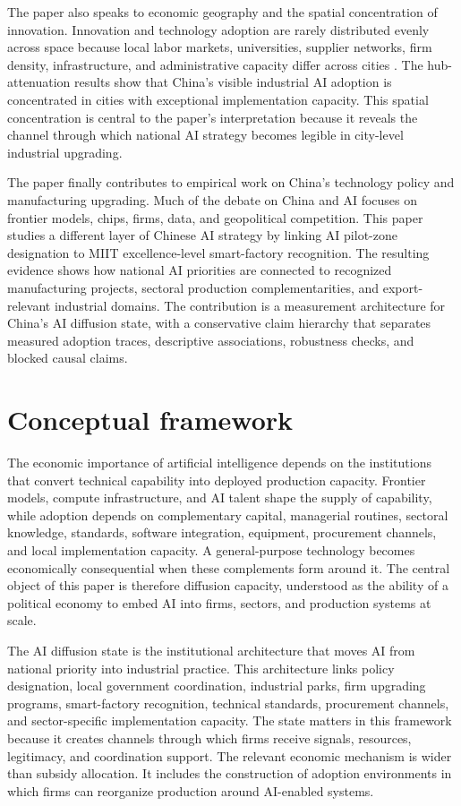 \documentclass[12pt]{article}
\begin{document}
The paper also speaks to economic geography and the spatial concentration of innovation. Innovation and technology adoption are rarely distributed evenly across space because local labor markets, universities, supplier networks, firm density, infrastructure, and administrative capacity differ across cities \citep{syverson2011productivity}. The hub-attenuation results show that China's visible industrial AI adoption is concentrated in cities with exceptional implementation capacity. This spatial concentration is central to the paper's interpretation because it reveals the channel through which national AI strategy becomes legible in city-level industrial upgrading.

The paper finally contributes to empirical work on China's technology policy and manufacturing upgrading. Much of the debate on China and AI focuses on frontier models, chips, firms, data, and geopolitical competition. This paper studies a different layer of Chinese AI strategy by linking AI pilot-zone designation to MIIT excellence-level smart-factory recognition. The resulting evidence shows how national AI priorities are connected to recognized manufacturing projects, sectoral production complementarities, and export-relevant industrial domains. The contribution is a measurement architecture for China's AI diffusion state, with a conservative claim hierarchy that separates measured adoption traces, descriptive associations, robustness checks, and blocked causal claims.

\section{Conceptual framework}
\label{sec:framework}

The economic importance of artificial intelligence depends on the institutions that convert technical capability into deployed production capacity. Frontier models, compute infrastructure, and AI talent shape the supply of capability, while adoption depends on complementary capital, managerial routines, sectoral knowledge, standards, software integration, equipment, procurement channels, and local implementation capacity. A general-purpose technology becomes economically consequential when these complements form around it. The central object of this paper is therefore diffusion capacity, understood as the ability of a political economy to embed AI into firms, sectors, and production systems at scale.

The AI diffusion state is the institutional architecture that moves AI from national priority into industrial practice. This architecture links policy designation, local government coordination, industrial parks, firm upgrading programs, smart-factory recognition, technical standards, procurement channels, and sector-specific implementation capacity. The state matters in this framework because it creates channels through which firms receive signals, resources, legitimacy, and coordination support. The relevant economic mechanism is wider than subsidy allocation. It includes the construction of adoption environments in which firms can reorganize production around AI-enabled systems.
\end{document}
